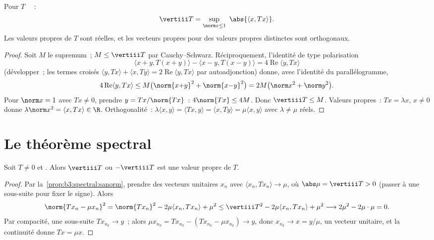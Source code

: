 \begin{proposition}\label{prop:b3:spectral:sanorm}
Pour $T$ ~~:
\[
\vertiii T = \sup_{\norm x \leq 1}\ \abs{\langle x,
Tx\rangle} .
\]
Les valeurs propres de $T$ sont réelles, et les vecteurs
propres pour des valeurs propres distinctes sont orthogonaux.
\end{proposition}

\begin{proof}
Soit $M$ le supremum~; $M \leq \vertiii T$ par
Cauchy--Schwarz. Réciproquement, l'identité de type
polarisation
\[
\langle x{+}y, T(x{+}y)\rangle - \langle x{-}y,
T(x{-}y)\rangle = 4\operatorname{Re}\langle y, Tx\rangle
\]
(développer~; les termes croisés $\langle y, Tx\rangle +
\langle x, Ty\rangle = 2\operatorname{Re}\langle y,
Tx\rangle$ par autoadjonction) donne, avec l'identité du
parallélogramme,
\[
4\operatorname{Re}\langle y, Tx\rangle \leq
M\bigl(\norm{x{+}y}^2 + \norm{x{-}y}^2\bigr) = 2M\bigl(\norm
x^2 + \norm y^2\bigr).
\]
Pour $\norm x = 1$ avec $Tx \neq 0$, prendre $y =
Tx/\norm{Tx}$~: $4\norm{Tx} \leq 4M$. Donc $\vertiii T \leq
M$. Valeurs propres~: $Tx = \lambda x$, $x \ne 0$ donne
$\lambda\norm x^2 = \langle x, Tx\rangle \in \R$.
Orthogonalité~: $\lambda\langle x, y\rangle = \langle Tx,
y\rangle = \langle x, Ty\rangle = \mu\langle x, y\rangle$
avec $\lambda \neq \mu$ réels.
\end{proof}

\section{Le théorème spectral}

\begin{lemma}
\label{lem:b3:spectral:existence}
Soit $T \neq 0$  et . Alors $\vertiii T$
ou $-\vertiii T$ est une valeur propre de $T$.
\end{lemma}

\begin{proof}
Par la~\cref{prop:b3:spectral:sanorm}, prendre des vecteurs
unitaires $x_n$ avec $\langle x_n, Tx_n\rangle \to \mu$, où
$\abs\mu = \vertiii T > 0$ (passer à une sous-suite pour fixer
le signe). Alors
\[
\norm{Tx_n - \mu x_n}^2
= \norm{Tx_n}^2 - 2\mu\langle x_n, Tx_n\rangle + \mu^2
\leq \vertiii T^2 - 2\mu\langle x_n, Tx_n\rangle + \mu^2
\longrightarrow 2\mu^2 - 2\mu\cdot\mu = 0 .
\]
Par compacité, une sous-suite $Tx_{n_k} \to y$~; alors $\mu
x_{n_k} = Tx_{n_k} - (Tx_{n_k} - \mu x_{n_k}) \to y$, donc
$x_{n_k} \to x = y/\mu$, un vecteur unitaire, et la
continuité donne $Tx = \mu x$.
\end{proof}

